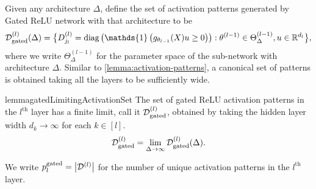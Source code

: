 Given any architecture \( \Delta \), define the set of activation patterns
generated by Gated ReLU network with that architecture to be
\begin{equation}\label{eq:gatd-relu-l-activation-patterns}
    \begin{aligned}
        \calDl_{\text{gated}}(\Delta) = \big\{
        \Dl_{j_l} =
        \diag\rbr{\mathds{1}\rbr{g_{\theta_{l-1}}(X) u \geq 0}}
        : \theta^{(l-1)} \in \Theta_\Delta^{(l-1)}, u \in \R^{d_{l}}
        \big\},
    \end{aligned}
\end{equation}
where we write \( \Theta^{(l-1)}_{\Delta} \) for the parameter space
of the sub-network with architecture \( \Delta \).
Similar to \cref{lemma:activation-patterns}, a canonical set of
patterns is obtained taking all the layers to be sufficiently wide.
\begin{restatable}{lemma}{gatedLimitingActivationSet}\label{lemma:gated-activation-patterns}
    The set of gated ReLU activation patterns in the \( l^{\text{th}} \) layer has a
    finite limit, call it \( \mathcal{D}^{(l)}_{\text{gated}} \), obtained by taking the hidden layer
    width \( d_{k} \rightarrow \infty \) for each \( k \in [l] \).
    \begin{equation}\label{eq:gated-limiting-activation-set}
        \mathcal{D}^{(l)}_{\text{gated}} = \lim_{\Delta \rightarrow \infty} \mathcal{D}^{(l)}_{\text{gated}}(\Delta).
    \end{equation}
\end{restatable}
We write \( p_{l}^{\text{gated}} = \left\vert \mathcal{D}^{(l)}\right\vert \) for the number of unique activation
patterns in the \( l^{\text{th}} \) layer.

